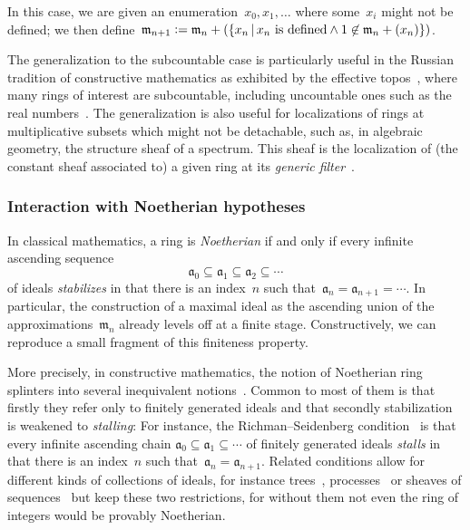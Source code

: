 \documentclass[envcountsect,envcountsame,runningheads]{llncs}
\newcommand{\aaa}{\mathfrak{a}}
\newcommand{\mmm}{\mathfrak{m}}
\newcommand{\defeq}{\vcentcolon=}
\renewcommand{\_}{\mathpunct{.}\,}
\begin{document}
In
this case, we are given an enumeration~$x_0,x_1,\ldots$ where some~$x_i$
might not be defined; we then define~$\mmm_{n+1} \defeq
\mmm_n + (\{ x_n \,|\, \text{$x_n$ is defined} \wedge 1 \not\in \mmm_n + (x_n) \})$.

The generalization to the subcountable case is particularly useful in the
Russian tradition of constructive mathematics as exhibited by the ef{}fective
topos~\cite{hyland:effective-topos,oosten:realizability,phoa:effective,bauer:c2c},
where many rings of interest are subcountable, including uncountable ones such as the real
numbers~\cite[Prop.~7.2]{hyland:effective-topos}. The generalization is also useful for
localizations of rings at multiplicative subsets which might not be detachable,
such as, in algebraic geometry, the structure sheaf of a spectrum. This sheaf
is the localization of (the constant sheaf associated to) a given ring at its
\emph{generic filter}~\cite[Section~3.3]{blechschmidt:generalized-spaces}.


\subsubsection{Interaction with Noetherian hypotheses}

In classical mathematics, a ring is \emph{Noetherian} if and only if every
infinite ascending sequence
\[ \aaa_0 \subseteq \aaa_1 \subseteq \aaa_2 \subseteq \cdots \]
of ideals \emph{stabilizes} in that there is an index~$n$ such that~$\aaa_n =
\aaa_{n+1} = \cdots$. In particular, the construction of a maximal ideal as the
ascending union of the approximations~$\mmm_n$ already levels off at a finite
stage. Constructively, we can reproduce a small fragment of this
finiteness property.

More precisely, in constructive mathematics, the notion of Noetherian ring
splinters into several inequivalent notions~\cite{richman:noetherian,mines-richman-ruitenburg:constructive-algebra,perdry:noetherian,perdry:lazy,perdry-schuster:noetherian,coquand-lombardi:krull,coquand:invariant,tennenbaum:hilbert,seidenberg:noether,jacobsson-lofwall:standard}. Common to most of them
is that firstly they refer only to finitely generated ideals and that secondly
stabilization is weakened to \emph{stalling}: For instance, the Richman--Seidenberg
condition~\cite[Section~III.2]{mines-richman-ruitenburg:constructive-algebra}
is that every infinite ascending chain
$\aaa_0 \subseteq \aaa_1 \subseteq \cdots$ of finitely generated ideals
\emph{stalls} in that there is an index~$n$ such that~$\aaa_n = \aaa_{n+1}$.
Related conditions allow for different kinds of collections of ideals, for
instance trees~\cite{richman:noetherian}, processes~\cite[Section~3.9]{blechschmidt:phd} or
sheaves of sequences~\cite{coquand-lombardi:krull,coquand:invariant,blechschmidt:multiverse}
but keep these two restrictions, for without them not
even the ring of integers would be provably Noetherian.
\end{document}
